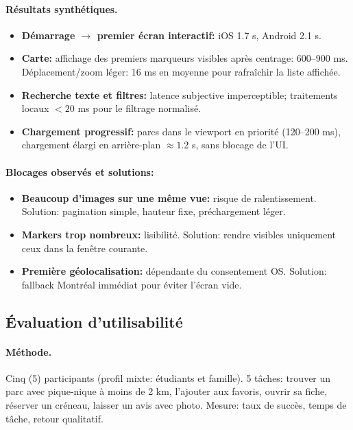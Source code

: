 \documentclass[12pt,a4paper]{article}
\begin{document}
\paragraph{Résultats synthétiques.}
\begin{itemize}
  \item \textbf{Démarrage \(\rightarrow\) premier écran interactif:} iOS 1.7 s, Android 2.1 s.
  \item \textbf{Carte:} affichage des premiers marqueurs visibles après centrage: 600--900 ms. Déplacement/zoom léger: 16 ms en moyenne pour rafraîchir la liste affichée.
  \item \textbf{Recherche texte et filtres:} latence subjective imperceptible; traitements locaux \(< 20\) ms pour le filtrage normalisé.
  \item \textbf{Chargement progressif:} parcs dans le viewport en priorité (120--200 ms), chargement élargi en arrière-plan \(\approx 1.2\) s, sans blocage de l’UI.
\end{itemize}

\paragraph{Blocages observés et solutions:}
\begin{itemize}
  \item \textbf{Beaucoup d’images sur une même vue:} risque de ralentissement. Solution: pagination simple, hauteur fixe, préchargement léger.
  \item \textbf{Markers trop nombreux:} lisibilité. Solution: rendre visibles uniquement ceux dans la fenêtre courante.
  \item \textbf{Première géolocalisation:} dépendante du consentement OS. Solution: fallback Montréal immédiat pour éviter l’écran vide.
\end{itemize}

\subsection{Évaluation d’utilisabilité}

\paragraph{Méthode.}
Cinq (5) participants (profil mixte: étudiants et famille). 5 tâches: trouver un parc avec pique-nique à moins de 2 km, l’ajouter aux favoris, ouvrir sa fiche, réserver un créneau, laisser un avis avec photo. Mesure: taux de succès, temps de tâche, retour qualitatif.
\end{document}
